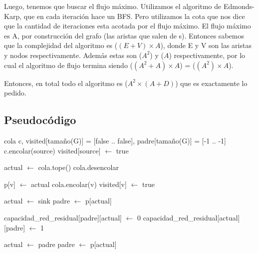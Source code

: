 \par{Luego, tenemos que buscar el flujo máximo. Utilizamos el algoritmo de Edmonds-Karp, que en cada iteración hace un BFS.
Pero utilizamos la cota que nos dice que la cantidad de iteraciones esta acotada por el flujo máximo. 
El flujo máximo es A, por construcción del grafo (las aristas que salen de s).
Entonces sabemos que la complejidad del algoritmo es \bigo($ (E + V) \times A$), donde E y V son las aristas y nodos respectivamente.
Además estas son \bigo($A^2$) y \bigo($A$) respectivamente, por lo cual el algoritmo de flujo termina siendo \bigo($ (A^2 + A) \times A$) 
= \bigo($ (A^2) \times A$). }

\par{Entonces, en total todo el algoritmo es \bigo($ A^2 \times (A + D) $) que es exactamente lo pedido.}


\subsection{Pseudocódigo}
	
\begin{algorithmic}
	\State cola c, visited[tamaño(G)] = [false .. false], padre[tamaño(G)] = [-1 .. -1]
	\State c.encolar(source)
	\State visited[source] $\leftarrow$ true

		\State actual $\leftarrow$ cola.tope()
		\State cola.desencolar
		
		 
					\State p[v] $\leftarrow$ actual
					\State cola.encolar(v)
					\State visited[v] $\leftarrow$ true
				\EndIf
		\EndFor 
	\EndWhile

		\State {} 
	\EndIf

	\State actual $\leftarrow$ sink
	\State padre $\leftarrow$ p[actual]
	
		\State capacidad_red_residual[padre][actual] $\leftarrow$ 0
		\State capacidad_red_residual[actual][padre] $\leftarrow$ 1
		
		\State actual $\leftarrow$ padre
		\State padre $\leftarrow$ p[actual]
	\EndWhile

	\State {} 
\EndFunction
\end{algorithmic}
\hspace{1cm}

